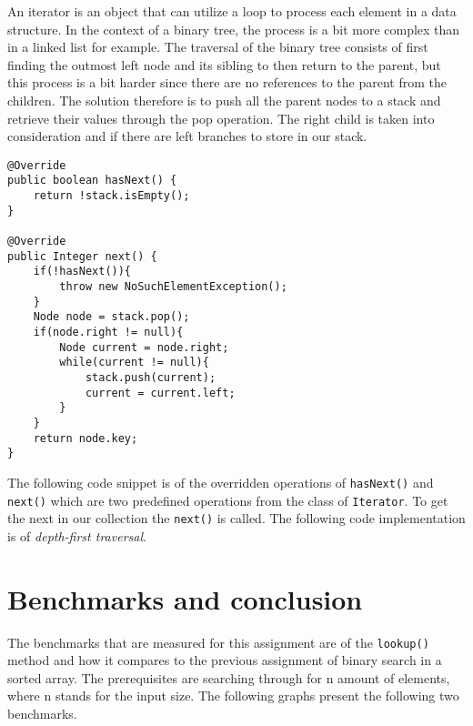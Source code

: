 \documentclass[a4paper,11pt]{article}
\begin{document}
        An iterator is an object that can utilize a loop to process each element in a data structure. In the context of a binary tree, the process is a bit more complex than in a linked list for example. The traversal of the binary tree consists of first finding the outmost left node and its sibling to then return to the parent, but this process is a bit harder since there are no references to the parent from the children. The solution therefore is to push all the parent nodes to a stack and retrieve their values through the pop operation. The right child is taken into consideration and if there are left branches to store in our stack.
\begin{verbatim}
@Override
public boolean hasNext() {
    return !stack.isEmpty();
}

@Override
public Integer next() {
    if(!hasNext()){
        throw new NoSuchElementException();
    }
    Node node = stack.pop();
    if(node.right != null){
        Node current = node.right;
        while(current != null){
            stack.push(current);
            current = current.left;
        }
    }
    return node.key;
}
\end{verbatim}
        The following code snippet is of the overridden operations of \texttt{hasNext()} and \texttt{next()} which are two predefined operations from the class of \texttt{Iterator}. To get the next in our collection the \texttt{next()} is called. The following code implementation is of \textit{depth-first traversal}.

\section*{Benchmarks and conclusion}

    The benchmarks that are measured for this assignment are of the \texttt{lookup()} method and how it compares to the previous assignment of binary search in a sorted array. The prerequisites are searching through for n amount of elements, where n stands for the input size. The following graphs present the following two benchmarks.
\end{document}
